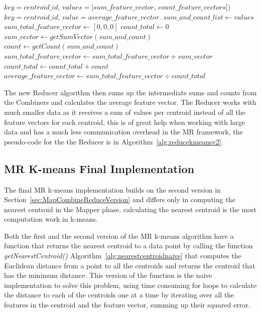 \begin{center}
\newcommand{\map}{\ensuremath{\mbox{\sc K-means Second Version: Reducer}}}
\begin{algorithm}[h!]
\caption{$\map(key,values)$}\label{alg:reducekmeansv2}
\begin{algorithmic}[1]
\REQUIRE $key = centroid\_id$, $values = [sum\_feature\_vector$, $count\_feature\_vectors])$
\ENSURE $key = centroid\_id$, $value = average\_feature\_vector$.
\STATE $sum\_and\_count\_list \leftarrow values$
\medskip
\STATE $sum\_total\_feature\_vector \leftarrow [0, 0, 0]$
\STATE $count\_total \leftarrow 0$
	\STATE $sum\_vector \leftarrow getSumVector(sum\_and\_count)$
	\STATE $count \leftarrow getCount(sum\_and\_count)$
	\STATE $sum\_total\_feature\_vector \leftarrow sum\_total\_feature\_vector + sum\_vector$
	\STATE $count\_total \leftarrow count\_total + count$
\ENDFOR
\medskip
\STATE $average\_feature\_vector \leftarrow sum\_total\_feature\_vector \div count\_total$
\medskip
{}
\end{algorithmic}
\end{algorithm}
\end{center}

The new Reducer algorithm then sums up the intermediate sums and counts from the Combiners and calculates the average feature vector. The Reducer works with much smaller data as it receives a sum of values per centroid instead of all the feature vectors for each centroid, this is of great help when working with large data and has a much less communication overhead in the MR framework, the pseudo-code for the the Reducer is in Algorithm~\ref{alg:reducekmeansv2}.


\subsection{MR K-means Final Implementation}
\label{sec:kmeansfinalversion}
The final MR k-means implementation builds on the second version in Section~\ref{sec:MapCombineReduceVersion} and differs only in computing the nearest centroid in the Mapper phase. calculating the nearest centroid is the most computation work in k-means.

Both the first and the second version of the MR k-means algorithm have a function that returns the nearest centroid to a data point by calling the function \textit{getNearestCentroid()} Algorithm~\ref{alg:nearestcentroidnaive} that computes the Euclidean distance from a point to all the centroids and returns the centroid that has the minimum distance. This version of the function is the naive implementation to solve this problem, using time consuming for loops to calculate the distance to each of the centroids one at a time by iterating over all the features in the centroid and the feature vector, summing up their squared error. 

